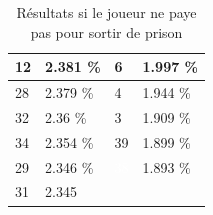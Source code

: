 \documentclass[letterpaper]{article}
\begin{document}
\begin{table}[h]
\begin{tabular}{|l|l||l|l|}
	  \cellcolor[HTML]{FF69B4} 12 & 2.381 \%  & \cellcolor[HTML]{E6E6FA}  6 & 1.997 \% \\ \hline
	  \cellcolor[HTML]{FFD700} 28 & 2.379 \%  & \cellcolor[HTML]{A0522D}  4 & 1.944 \% \\ \hline
	  \cellcolor[HTML]{2E8B57} 32 & 2.36 \%   & \cellcolor[HTML]{EEEED1}  3 & 1.909 \% \\ \hline
	  \cellcolor[HTML]{EEEED1} 34 & 2.354 \%  & \cellcolor[HTML]{8B1A1A} 39 & 1.899 \% \\ \hline
	  \cellcolor[HTML]{FFFFF0} 29 & 2.346 \%  & \cellcolor[HTML]{483D8B} \textcolor{white}{38} & 1.893 \%  \\ \hline
	  \cellcolor[HTML]{BEBEBE} 31 & 2.345 \\ \cline{1-2}
	\end{tabular}
	\caption{Résultats si le joueur ne paye pas pour sortir de prison}
	\label{result_paye_pas}
      \end{table}
\end{document}
